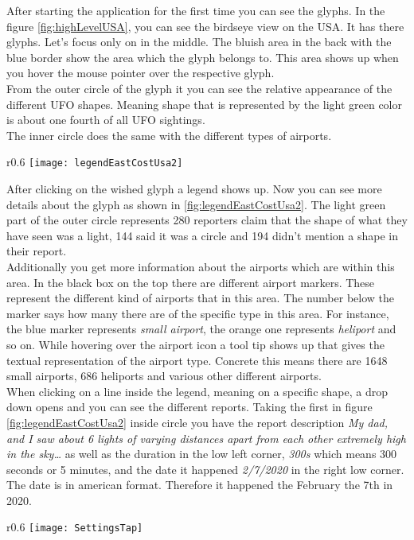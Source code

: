 \documentclass{article}
\begin{document}
After starting the application for the first time you can see the glyphs. In the figure \ref{fig:highLevelUSA}, you can see the birdseye view on the USA. It has there glyphs. Let's focus only on in the middle. The bluish area in the back with the blue border show the area which the glyph belongs to. This area shows up when you hover the mouse pointer over the respective glyph.
\\
From the outer circle of the glyph it you can see the relative appearance of the different UFO shapes. Meaning shape that is represented by the light green color is about one fourth of all UFO sightings.
\\
The inner circle does the same with the different types of airports.
\\

\begin{wrapfigure}{r}{0.6\textwidth} 
    \centering
    \texttt{[image: legendEastCostUsa2]}
    \caption{Legend of the East Coast USA glyph}
    \label{fig:legendEastCostUsa2}
\end{wrapfigure}

After clicking on the wished glyph a legend shows up. 
Now you can see more details about the glyph as shown in \ref{fig:legendEastCostUsa2}. 
The light green part of the outer circle represents 280 reporters claim that the shape 
of what they have seen was a light, 144 said it was a circle and 194 
didn't mention a shape in their report. \\

Additionally you get more information about the airports which are within this area. In the 
black box on the top there are different airport markers. These represent the different kind of airports
that in this area. The number below the marker says how many there are of the specific type
in this area. For instance, the blue marker represents \textit{small airport}, the orange
one represents \textit{heliport} and so on. While hovering over the airport icon a tool tip
shows up that gives the textual representation of the airport type. Concrete this means there are 
1648 small airports, 686 heliports and various other different airports. 
\\
When clicking on a line inside the legend, meaning on a specific shape, a drop down opens and you
can see the different reports. Taking the first in figure \ref{fig:legendEastCostUsa2} inside circle
you have the report description 
\textit{My dad, and I saw about 6 lights of varying distances apart from each other extremely high in the sky…}
as well as the duration in the low left corner, \textit{300s} which means 300 seconds 
or 5 minutes, and the date it happened \textit{2/7/2020} in the right low corner. The date is in 
american format. Therefore it happened the February the 7th in 2020.
\\
\newpage
\begin{wrapfigure}{r}{0.6\textwidth} 
    \centering
    \texttt{[image: SettingsTap]}
    \caption{Legend of the East Coast USA glyph}
    \label{fig:SettingsTap}
\end{wrapfigure}
\end{document}
